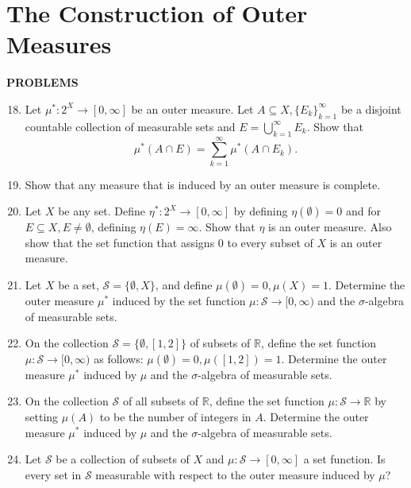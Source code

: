 \section{The Construction of Outer Measures}
\begin{center}
	\textbf{PROBLEMS}
\end{center}
\begin{enumerate}
	\setcounter{enumi}{17}
	\item Let $\mu^*:2^X\to[0,\infty]$ be an outer measure.
	Let $A\subseteq X, \{E_k\}_{k=1}^\infty$ be a disjoint countable collection of measurable sets and $E=\bigcup_{k=1}^\infty E_k$. Show that
	\[
		\mu^*(A\cap E)=\sum_{k=1}^\infty \mu^*(A\cap E_k).
	\]
	\item Show that any measure that is induced by an outer measure is complete.
	\item Let $X$ be any set.
	Define $\eta^*:2^X\to[0,\infty]$ by defining $\eta(\emptyset)=0$ and for $E\subseteq X,E\neq\emptyset$, defining $\eta(E)=\infty$.
	Show that $\eta$ is an outer measure.
	Also show that the set function that assigns $0$ to every subset of $X$ is an outer measure.
	\item Let $X$ be a set, $\mathcal{S}=\{\emptyset,X\}$, and define $\mu(\emptyset)=0,\mu(X)=1$. 
	Determine the outer measure $\mu^*$ induced by the set function $\mu:\mathcal{S}\to[0,\infty)$ and the $\sigma$-algebra of measurable sets.
	\item On the collection $\mathcal{S}=\{\emptyset,[1,2]\}$ of subsets of $\mathbb{R}$, define the set function $\mu:\mathcal{S}\to[0,\infty)$ as follows: $\mu(\emptyset)=0,\mu([1,2])=1$. 
	Determine the outer measure $\mu^*$ induced by $\mu$ and the $\sigma$-algebra of measurable sets.
	\item On the collection $\mathcal{S}$ of all subsets of $\mathbb{R}$, define the set function $\mu:\mathcal{S}\to\mathbb{R}$ by setting $\mu(A)$ to be the number of integers in $A$.
	Determine the outer measure $\mu^*$ induced by $\mu$ and the $\sigma$-algebra of measurable sets.
	\item Let $\mathcal{S}$ be a collection of subsets of $X$ and $\mu:\mathcal{S}\to[0,\infty]$ a set function.
	Is every set in $\mathcal{S}$ measurable with respect to the outer measure induced by $\mu$?
\end{enumerate}

